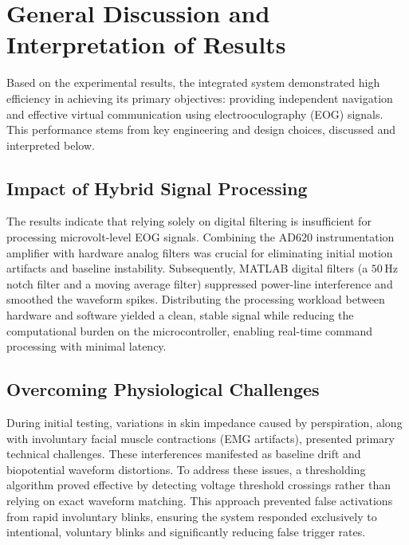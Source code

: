 \section{General Discussion and Interpretation of Results}
\label{sec:general_discussion}

Based on the experimental results, the integrated system demonstrated high efficiency
in achieving its primary objectives: providing independent navigation and effective
virtual communication using electrooculography (EOG) signals. This performance stems
from key engineering and design choices, discussed and interpreted below.

\subsection{Impact of Hybrid Signal Processing}
\label{subsec:impact_hybrid_signal_processing}

The results indicate that relying solely on digital filtering is insufficient for
processing microvolt-level EOG signals. Combining the AD620 instrumentation amplifier
with hardware analog filters was crucial for eliminating initial motion artifacts and
baseline instability. Subsequently, MATLAB digital filters (a $50\,\text{Hz}$ notch
filter and a moving average filter) suppressed power-line interference and smoothed
the waveform spikes. Distributing the processing workload between hardware and software
yielded a clean, stable signal while reducing the computational burden on the
microcontroller, enabling real-time command processing with minimal latency.

\subsection{Overcoming Physiological Challenges}
\label{subsec:overcoming_physiological_challenges}

During initial testing, variations in skin impedance caused by perspiration, along with
involuntary facial muscle contractions (EMG artifacts), presented primary technical
challenges. These interferences manifested as baseline drift and biopotential waveform
distortions. To address these issues, a thresholding algorithm proved effective by
detecting voltage threshold crossings rather than relying on exact waveform matching.
This approach prevented false activations from rapid involuntary blinks, ensuring the
system responded exclusively to intentional, voluntary blinks and significantly reducing
false trigger rates.

